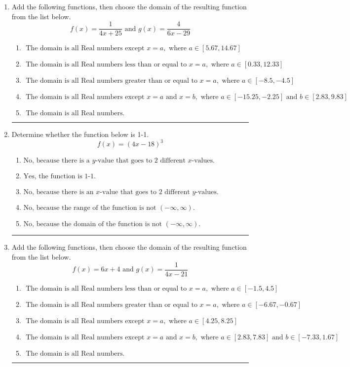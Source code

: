 \documentclass[14pt]{extbook}
\newcommand{\litem}[1]{\item#1\hspace*{-1cm}\rule{\textwidth}{0.4pt}}
\begin{document}
\begin{enumerate}
{\begin{enumerate}[label=\Alph*.]
\end{enumerate} }
\litem{
Add the following functions, then choose the domain of the resulting function from the list below.\[ f(x) = \frac{1}{4x+25} \text{ and } g(x) = \frac{4}{6x-29} \]\begin{enumerate}[label=\Alph*.]
\item \( \text{ The domain is all Real numbers except } x = a, \text{ where } a \in [5.67, 14.67] \)
\item \( \text{ The domain is all Real numbers less than or equal to } x = a, \text{ where } a \in [0.33, 12.33] \)
\item \( \text{ The domain is all Real numbers greater than or equal to } x = a, \text{ where } a \in [-8.5, -4.5] \)
\item \( \text{ The domain is all Real numbers except } x = a \text{ and } x = b, \text{ where } a \in [-15.25, -2.25] \text{ and } b \in [2.83, 9.83] \)
\item \( \text{ The domain is all Real numbers. } \)

\end{enumerate} }
\litem{
Determine whether the function below is 1-1.\[ f(x) = (4 x - 18)^3 \]\begin{enumerate}[label=\Alph*.]
\item \( \text{No, because there is a $y$-value that goes to 2 different $x$-values.} \)
\item \( \text{Yes, the function is 1-1.} \)
\item \( \text{No, because there is an $x$-value that goes to 2 different $y$-values.} \)
\item \( \text{No, because the range of the function is not $(-\infty, \infty)$.} \)
\item \( \text{No, because the domain of the function is not $(-\infty, \infty)$.} \)

\end{enumerate} }
\litem{
Add the following functions, then choose the domain of the resulting function from the list below.\[ f(x) = 6x + 4 \text{ and } g(x) = \frac{1}{4x-21} \]\begin{enumerate}[label=\Alph*.]
\item \( \text{ The domain is all Real numbers less than or equal to } x = a, \text{ where } a \in [-1.5, 4.5] \)
\item \( \text{ The domain is all Real numbers greater than or equal to } x = a, \text{ where } a \in [-6.67, -0.67] \)
\item \( \text{ The domain is all Real numbers except } x = a, \text{ where } a \in [4.25, 8.25] \)
\item \( \text{ The domain is all Real numbers except } x = a \text{ and } x = b, \text{ where } a \in [2.83, 7.83] \text{ and } b \in [-7.33, 1.67] \)
\item \( \text{ The domain is all Real numbers. } \)


\end{enumerate}}
\end{enumerate}
\end{document}
